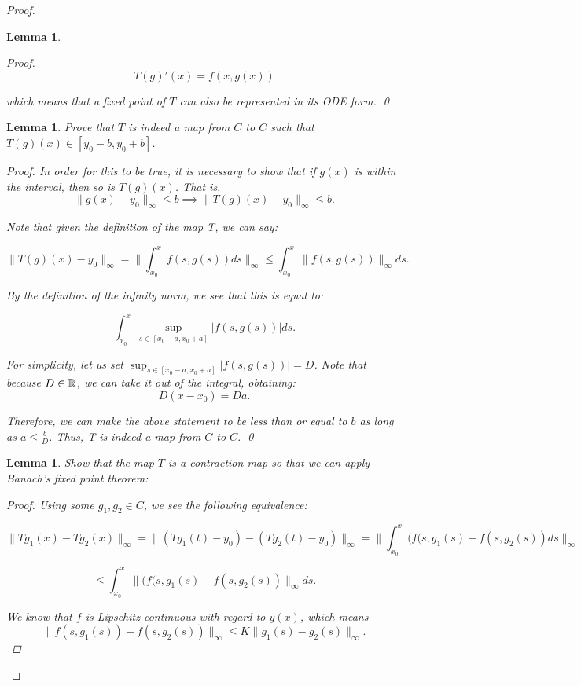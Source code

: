 \documentclass{article}
\newtheorem{lemma}[theorem]{Lemma}
\theoremstyle{remark}
\begin{document}
\begin{proof}
\begin{lemma}
\begin{proof}
        $$ T(g)'(x) = f(x, g(x))$$

        which means that a fixed point of $T$ can also be represented in its ODE form.
        \qed
\phantom\qedhere
    \end{proof}
\end{lemma}


\begin{lemma}
Prove that $T$ is indeed a map from $C$ to $C$ such that $T(g)(x) \in [y_0 -b, y_0 +b]$. 
\begin{proof}
In order for this to be true, it is necessary to show that if $g(x)$ is within the interval, then so is $T(g)(x)$. That is, 
$$\| g(x) - y_0\|_{\infty} \leq b \implies \|T(g)(x)-y_0\|_\infty \leq b.$$

Note that given the definition of the map T, we can say:

$$\|T(g)(x)-y_0\|_\infty = \|\int_{x_0}^xf(s, g(s))ds\|_{\infty} \leq \int_{x_0}^x \|f(s, g(s))\|_\infty ds.$$

By the definition of the infinity norm, we see that this is equal to:

$$ \int_{x_0}^{x}\sup_{s \in [x_0 -a, x_0 +a]}|f(s,g(s))| ds.$$

For simplicity, let us set $\sup_{s \in [x_0 -a, x_0 +a]}|f(s,g(s))| = D$. Note that because $D \in \Bbb R$, we can take it out of the integral, obtaining:
$$D(x-x_0) = Da.$$

Therefore, we can make the above statement to be less than or equal to $b$ as long as $a \leq \frac{b}{D}$. Thus, T is indeed a map from $C$ to $C$.
\qed
\phantom\qedhere
\end{proof}
    
\end{lemma}

\begin{lemma}
Show that the map $T$ is a contraction map so that we can apply Banach's fixed point theorem:
    \begin{proof}
        Using some $g_1, g_2 \in C$, we see the following equivalence:


$$ \|Tg_1(x) -Tg_2(x)\|_\infty = \|(Tg_1(t)-y_0) - (Tg_2(t) - y_0)\|_\infty = \|\int_{x_0}^x (f(s, g_1(s) - f(s, g_2(s))ds\|_{\infty}$$

$$ \leq \int_{x_0}^x \|(f(s, g_1(s) - f(s, g_2(s))\|_\infty ds.$$

We know that $f$ is Lipschitz continuous with regard to $y(x)$, which means 
$$\|f(s, g_1(s)) - f(s, g_2(s))\|_{\infty} \leq K\|g_1(s) - g_2(s) \|_{\infty}.$$


\end{proof}
\end{lemma}
\end{proof}
\end{document}

